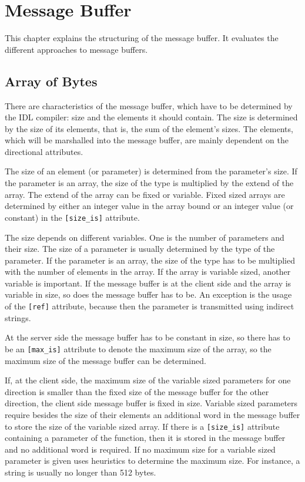 \section{Message Buffer}
\label{sec:message-buffer}

This chapter explains the structuring of the message buffer.  It
evaluates the different approaches to message buffers.

\subsection{Array of Bytes}

There are characteristics of the message buffer, which have to be determined
by the IDL compiler: size and the elements it should contain.  The size is
determined by the size of its elements, that is, the sum of the element's
sizes.  The elements, which will be marshalled into the message buffer, are
mainly dependent on the directional attributes.

The size of an element (or parameter) is determined from the parameter's
size.  If the parameter is an array, the size of the type is multiplied by
the extend of the array.  The extend of the array can be fixed or variable.
Fixed sized arrays are determined by either an integer value in the array
bound or an integer value (or constant) in the \verb|[size_is]| attribute.

The size depends on different variables.
One is the number of parameters and their size.  The size of a parameter is
usually determined by the type of the parameter.  If the parameter is an
array, the size of the type has to be multiplied with the number of elements
in the array.  If the array is variable sized, another variable is
important.  If the message buffer is at the client side and the array is
variable in size, so does the message buffer has to be.  An exception is the
usage of the \verb|[ref]| attribute, because then the parameter is transmitted
using indirect strings.

At the server side the message buffer has to be constant in size, so there
has to be an \verb|[max_is]| attribute to denote the maximum size of the
array, so the maximum size of the message buffer can be determined.

If, at the client side, the maximum size of the variable sized parameters
for one direction is smaller than the fixed size of the message buffer for
the other direction, the client side message buffer is fixed in size.
Variable sized parameters require besides the size of their elements an
additional word in the message buffer to store the size of the variable sized
array.  If there is a \verb|[size_is]| attribute containing a parameter of
the function, then it is stored in the message buffer and no additional word
is required.  If no maximum size for a variable sized parameter is given
\dice{} uses heuristics to determine the maximum size.  For instance, a
string is usually no longer than 512 bytes.

